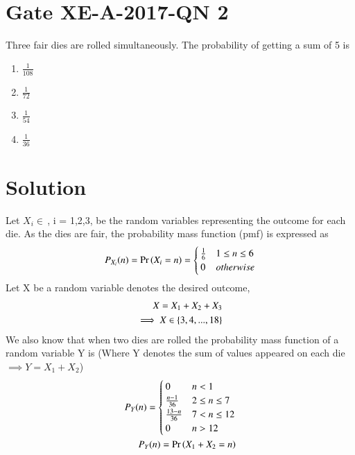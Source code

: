 \documentclass[journal,12pt,twocolumn]{IEEEtran}
\begin{document}
\section{Gate XE-A-2017-QN 2}
Three fair dies are rolled simultaneously. The probability of getting a sum of 5 is
\begin{enumerate}[label=(\Alph*)]
    \item $\frac{1}{108}$
    \item $\frac{1}{72}$
    \item $\frac{1}{54}$
    \item $\frac{1}{36}$
\end{enumerate}

\section{Solution}
Let
$X_i\in\,$, i = 1,2,3, be the random variables representing the outcome for each die. As the dies are fair, the probability mass function (pmf) is expressed as
\begin{align}
    P_{X_i}(n) = \Pr\left(X_i = n\right) = 
\begin{cases}
\frac{1}{6} & 1 \le n \le 6
\\
0 & otherwise
\end{cases}\label{1}
\end{align}
Let X be a random variable denotes the desired outcome,
\begin{align}
    X=X_1+X_2+X_3\label{2}\\
    \implies X\in\left\{3,4,...,18\right\}
\end{align}
We also know that when two dies are rolled the probability mass function of a random variable Y is (Where Y denotes the sum of values appeared on each die$\implies Y=X_1+X_2$)
\begin{align}
P_Y(n)= 
\begin{cases}
0 & n < 1
\\
\frac{n-1}{36} &  2 \le n \le  7
\\
\frac{13-n}{36} & 7 < n \le 12
\\
0 & n > 12
\end{cases}\label{3}\\
P_Y(n)=\Pr\left(X_1+X_2=n\right) 
\end{align}
\end{document}
